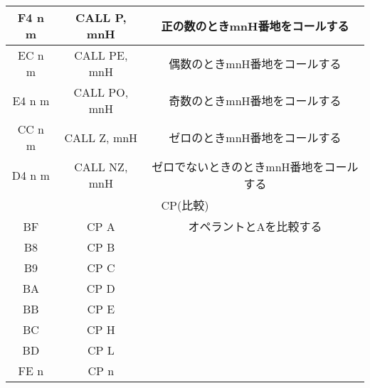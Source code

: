 \begin{center}
\begin{tabular}{|c|c|c|}
F4 n m& CALL P, mnH&  正の数のときmnH番地をコールする\\ \hline
EC n m& CALL PE, mnH& 偶数のときmnH番地をコールする\\ \hline
E4 n m& CALL PO, mnH& 奇数のときmnH番地をコールする\\ \hline
CC n m& CALL Z, mnH& ゼロのときmnH番地をコールする\\ \hline
D4 n m& CALL NZ, mnH& ゼロでないときのときmnH番地をコールする\\ \hline
\hline
\multicolumn{3}{|c|}{CP(比較)}\\
\hline
BF& CP A& オペラントとAを比較する\\ \hline
B8& CP B& \\ \hline
B9& CP C& \\ \hline
BA& CP D& \\ \hline
BB& CP E& \\ \hline
BC& CP H& \\ \hline
BD& CP L& \\ \hline
FE n& CP n& \\ \hline
\end{tabular}
\end{center}

\newpage



